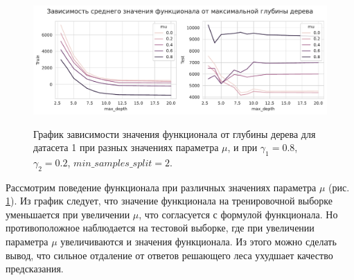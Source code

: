 \documentclass{article}
\begin{document}
\begin{figure}[h]
	\begin{center}
		\begin{minipage}[h]{1.0\linewidth}
			{\includegraphics[width=1.0\linewidth]{../figures/max_depth_task1_gamma_08_min_2.pdf}}	
		\end{minipage}
	\end{center}
	
	\caption{График зависимости значения функционала от глубины дерева для датасета 1 при разных значениях параметра $\mu$, и при $\gamma_1 = 0.8$, $\gamma_2 = 0.2$, $min\_samples\_split = 2$. }
	\label{ris:image7}
\end{figure}

Рассмотрим поведение функционала при различных значениях параметра $\mu$ (рис. \ref{ris:image7}). Из график следует, что значение функционала на тренировочной выборке уменьшается при увеличении $\mu$, что согласуется с формулой функционала. Но противоположное наблюдается на тестовой выборке, где при увеличении параметра $\mu$ увеличиваются и значения функционала. Из этого можно сделать вывод, что сильное отдаление от ответов решающего леса ухудшает качество предсказания.




\newpage




\end{document}
